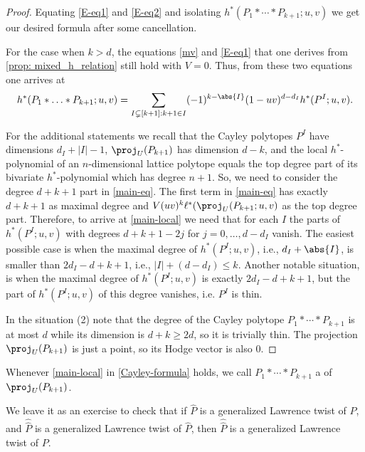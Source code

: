 \documentclass[reqno, 11pt, a4paper, oneside]{amsart}
\begin{document}
\begin{proof}
Equating \eqref{E-eq1} and \eqref{E-eq2} and isolating $h^*(P_1 * \cdots *  P_{k+1};u,v)$ we get our desired formula after some cancellation. 

For the case when $k>d$, the equations  \eqref{mv} and  \eqref{E-eq1} that one derives 
from \cref{prop: mixed_h_relation} still hold with $V=0$. Thus, from these two equations one arrives  at 
\[ h^*(P_1 * \ldots * P_{k+1};u,v) =\sum_{I \subsetneq[k+1]: k+1 \in I} (-1)^{k -\abs{I}} (1-uv)^{d-d_I} h^*(P^I; u,v). \] 



For the additional statements we recall that the Cayley polytopes $P^I$ have dimensions $d_I+|I|-1$, $\proj_U(P_{k+1})$ has dimension $d-k$, and the local $h^*$-polynomial of an $n$-dimensional lattice polytope equals the top degree part of its bivariate $h^*$-polynomial which has degree $n+1$. So, we need to consider the degree $d+k+1$ part in \eqref{main-eq}.
The first term in \eqref{main-eq} has exactly $d+k+1$ as maximal degree and $ V (u v)^k \ell^*(\proj_U(P_{k+1};u,v)$ as the top degree part. Therefore, to arrive at \eqref{main-local} we need that for each $I$ the parts of $h^*(P^I;u,v)$  with degrees $d+k+1-2j$ for $j=0,\ldots, d-d_I$ vanish. 
The easiest possible case is when the maximal degree of $h^*(P^I;u,v)$, i.e., $d_I+\abs{I}$, is smaller than $2d_I-d+k+1$, i.e., $|I|+(d-d_I) \le k$. 
Another notable situation, is when the maximal degree of $h^*(P^I;u,v)$ is exactly  $2d_I-d+k+1$, but the part of $h^*(P^I;u,v)$ of this degree vanishes, i.e. $P^I$ is thin.  

In the situation (2) note that the degree of the Cayley polytope $P_1 * \cdots *  P_{k+1}$ is at most $d$ while its dimension is $d+k\ge 2d$, so it is trivially thin. The projection $\proj_U(P_{k+1})$ is just a point, so its Hodge vector is also $0$. 


\end{proof}

\begin{dfn}
Whenever \eqref{main-local} in \cref{Cayley-formula} holds, we call $P_1 * \cdots * P_{k+1}$ a  of $\proj_U(P_{k+1})$.
\end{dfn}

\begin{rem}
We leave it as an exercise to check that if $\hat{P}$ is a generalized Lawrence twist of $P$, and $\hat{\hat{P}}$ is a generalized Lawrence twist of $\hat{P}$, then $\hat{\hat{P}}$ is a generalized Lawrence twist of $P$.\label{comp}
\end{rem}
\end{document}
